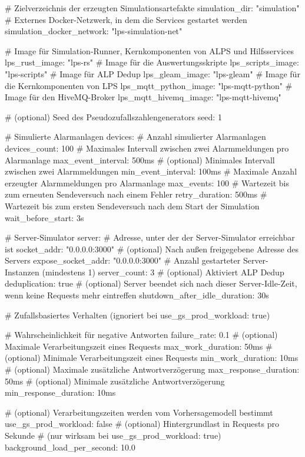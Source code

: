\begin{yamlcode}[title={Allgemeiner Teil}]
# Zielverzeichnis der erzeugten Simulationsartefakte
simulation_dir: "simulation"
# Externes Docker-Netzwerk, in dem die Services gestartet werden
simulation_docker_network: "lps-simulation-net"

# Image für Simulation-Runner, Kernkomponenten von ALPS und Hilfsservices
lps_rust_image: "lps-rs"
# Image für die Auswertungsskripte
lps_scripts_image: "lps-scripts"
# Image für ALP Dedup
lps_gleam_image: "lps-gleam"
# Image für die Kernkomponenten von LPS
lps_mqtt_python_image: "lps-mqtt-python"
# Image für den HiveMQ-Broker
lps_mqtt_hivemq_image: "lps-mqtt-hivemq"

# (optional) Seed des Pseudozufallszahlengenerators
seed: 1
\end{yamlcode}

\newpage

\begin{yamlcode}[title={Allgemeiner Teil}]
# Simulierte Alarmanlagen
devices:
  # Anzahl simulierter Alarmanlagen
  devices_count: 100
  # Maximales Intervall zwischen zwei Alarmmeldungen pro Alarmanlage
  max_event_interval: 500ms
  # (optional) Minimales Intervall zwischen zwei Alarmmeldungen
  min_event_interval: 100ms
  # Maximale Anzahl erzeugter Alarmmeldungen pro Alarmanlage
  max_events: 100
  # Wartezeit bis zum erneuten Sendeversuch nach einem Fehler
  retry_duration: 500ms
  # Wartezeit bis zum ersten Sendeversuch nach dem Start der Simulation
  wait_before_start: 3s
\end{yamlcode}

\newpage

\begin{yamlcode}[title={Allgemeiner Teil}]
# Server-Simulator
server:
  # Adresse, unter der der Server-Simulator erreichbar ist
  socket_addr: "0.0.0.0:3000"
  # (optional) Nach außen freigegebene Adresse des Servers
  expose_socket_addr: "0.0.0.0:3000"
  # Anzahl gestarteter Server-Instanzen (mindestens 1)
  server_count: 3
  # (optional) Aktiviert ALP Dedup
  deduplication: true
  # (optional) Server beendet sich nach dieser Server-Idle-Zeit, wenn keine Requests mehr eintreffen
  shutdown_after_idle_duration: 30s

  # Zufallsbasiertes Verhalten (ignoriert bei use_gs_prod_workload: true)

  # Wahrscheinlichkeit für negative Antworten
  failure_rate: 0.1
  # (optional) Maximale Verarbeitungszeit eines Requests
  max_work_duration: 50ms
  # (optional) Minimale Verarbeitungszeit eines Requests
  min_work_duration: 10ms
  # (optional) Maximale zusätzliche Antwortverzögerung
  max_response_duration: 50ms
  # (optional) Minimale zusätzliche Antwortverzögerung
  min_response_duration: 10ms

  # (optional) Verarbeitungszeiten werden vom Vorhersagemodell bestimmt
  use_gs_prod_workload: false
  # (optional) Hintergrundlast in Requests pro Sekunde
  # (nur wirksam bei use_gs_prod_workload: true)
  background_load_per_second: 10.0
\end{yamlcode}

